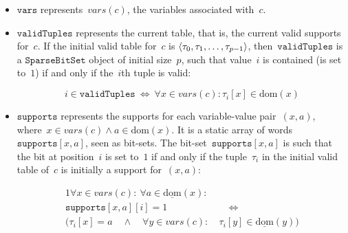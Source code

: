 \documentclass[a4paper,11pt]{article}
\newcommand{\Dom}[1]{\text{dom}({#1})}
\newcommand{\Dominit}[1]{\underline{\text{dom}}(#1)}
\newcommand{\SparseBitSet}{\texttt{SparseBitSet}}
\newcommand{\Scp}{\texttt{vars}}
\newcommand{\CurrTable}{\texttt{validTuples}}
\newcommand{\Supports}{\texttt{supports}}
\numberwithin{equation}{section}
\begin{document}
\begin{itemize}
  \item $\Scp$ represents~$vars(c)$, the variables associated with~$c$.
  
  \item $\CurrTable$ represents the current table,
    that is, the current valid supports for~$c$. If the initial valid table for~$c$
    is
    $\left\langle\tau_0, \tau_1, \ldots, \tau_{p-1}\right\rangle$,
    then~$\CurrTable$ is a 
    $\SparseBitSet$ object of initial size~$p$, such that value~$i$
    is contained (is set to~$1$) if and only if the~$i$th tuple is valid:
    
    \begin{equation} \label{eq:currtable}
      i \in \CurrTable \ \Leftrightarrow \ \forall x \in vars(c): \tau_i[x] \in \Dom{x}
    \end{equation}

  \item $\Supports$ represents the supports for each variable-value pair~$(x,a)$,
    where~$x \in vars(c) \land a \in \Dom{x}$.
    It is a static array of words~$\Supports[x,a]$, seen as bit-sets.
    The bit-set~$\Supports[x,a]$ is such that
    the bit at position~$i$ is set to~$1$ if and only if the 
    tuple~$\tau_i$ in the initial valid table of~$c$ is initially a support for~$(x,a)$:

    \begin{alignat}{1}
      \forall x \in vars(c): \ \forall a \in \Dominit{x}:& \\
      \Supports[x,a][i] = 1 &\quad \Leftrightarrow \\
      (\tau_i[x] = a \quad \land \quad
      \forall y \in vars(c): \ &\tau_i[y] \in \Dominit{y})
    \end{alignat}


    

\end{itemize}
\end{document}
